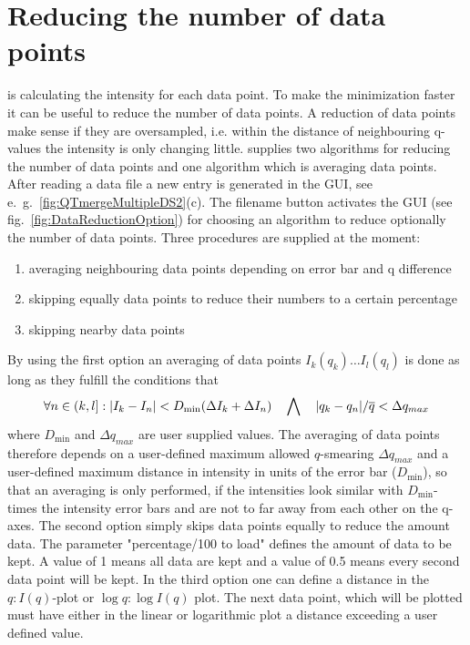 \section{Reducing the number of data points}

\SASfit is calculating the intensity for each data point. To make the minimization faster it can be useful to reduce the number of data points. A reduction of data points make sense if they are oversampled, i.e. within the distance of neighbouring q-values the intensity is only changing little. \SASfit supplies two algorithms for reducing the number of data points and one algorithm which is averaging data points.
After reading a data file a new entry is generated in the GUI, see e.\ g.\  \ref{fig:QTmergeMultipleDS2}(c). The filename button activates the GUI (see fig.\ \ref{fig:DataReductionOption}) for choosing an algorithm to reduce optionally the number of data points. Three procedures are supplied at the moment:
\begin{enumerate}
\item averaging neighbouring data points depending on error bar and q difference
\item skipping equally data points to reduce their numbers to a certain percentage
\item skipping nearby data points
\end{enumerate}
 By using the first option an averaging of data points $I_k(q_k) \ldots I_l(q_l)$ is done as long as they fulfill the conditions that
\begin{align}
\forall n \in (k,l] : \abs{I_k-I_n} < D_\mathrm{min} (\Delta I_k + \Delta I_n)
\quad \bigwedge \quad \abs{q_k-q_n}/\overline{q} <  \Delta q_{max}
\end{align}
where $D_\mathrm{min} $ and $\Delta q_{max}$ are user supplied values.
The averaging of data points therefore depends on a user-defined maximum allowed $q$-smearing $\Delta q_{max}$ and  a user-defined maximum distance in intensity in units of the error bar ($D_\mathrm{min} $), so that an averaging is only performed, if the intensities look similar with $D_\mathrm{min}$-times the intensity error bars and are not to far away from each other on the q-axes.
The second option simply skips data points equally to reduce the amount data. The parameter "percentage/100 to load" defines the amount of data to be kept. A value of 1 means all data are kept and a value of 0.5 means every second data point will be kept. In the third option one can define a distance in the $q:I(q)$-plot or $\log q: \log I(q)$ plot. The next data point, which will be plotted must have either in the linear or logarithmic plot a distance exceeding a user defined value.

